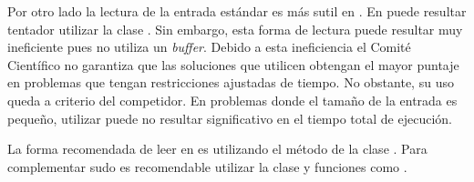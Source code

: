   Por otro lado la lectura de la entrada estándar es más sutil en \java.
  En \java puede resultar tentador utilizar la clase .
  Sin embargo, esta forma de lectura puede resultar muy ineficiente pues no
  utiliza un \textit{buffer}.
  Debido a esta ineficiencia el Comité Científico no garantiza que las
  soluciones que utilicen  obtengan el mayor puntaje en problemas
  que tengan restricciones ajustadas de tiempo.
  No obstante, su uso queda a criterio del competidor.
  En problemas donde el tamaño de la entrada es pequeño, utilizar 
  puede no resultar significativo en el tiempo total de ejecución.

  La forma recomendada de leer en \java es utilizando el método 
  de la clase .
  Para complementar sudo es recomendable utilizar la clase
   y funciones como .


